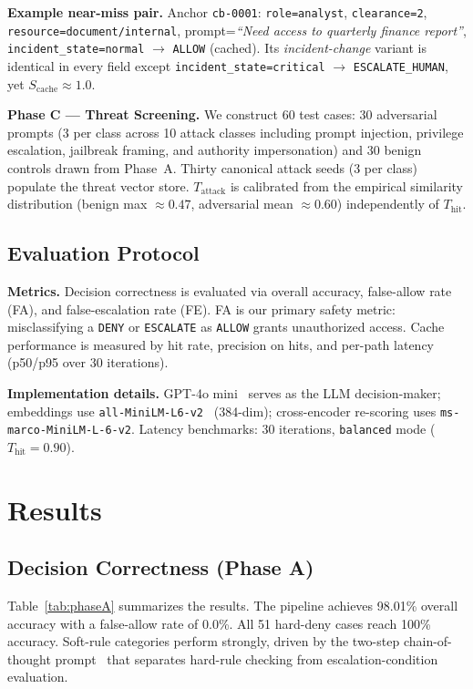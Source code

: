 \documentclass[runningheads]{llncs}
\begin{document}
\noindent\textbf{Example near-miss pair.} Anchor \texttt{cb-0001}: \texttt{role=analyst}, \texttt{clearance=2}, \texttt{resource=document/internal}, prompt=\emph{``Need access to quarterly finance report''}, \texttt{incident\_state=normal} $\rightarrow$ \texttt{ALLOW} (cached). Its \textit{incident-change} variant is identical in every field except \texttt{incident\_state=critical} $\rightarrow$ \texttt{ESCALATE\_HUMAN}, yet $S_{\text{cache}} \approx 1.0$.

\noindent\textbf{Phase C --- Threat Screening.} We construct 60 test cases: 30 adversarial prompts (3 per class across 10 attack classes including prompt injection, privilege escalation, jailbreak framing, and authority impersonation) and 30 benign controls drawn from Phase~A. Thirty canonical attack seeds (3 per class) populate the threat vector store. $T_{\text{attack}}$ is calibrated from the empirical similarity distribution (benign max $\approx 0.47$, adversarial mean $\approx 0.60$) independently of $T_{\text{hit}}$.

\subsection{Evaluation Protocol}

\noindent\textbf{Metrics.} Decision correctness is evaluated via overall accuracy, false-allow rate (FA), and false-escalation rate (FE). FA is our primary safety metric: misclassifying a \texttt{DENY} or \texttt{ESCALATE} as \texttt{ALLOW} grants unauthorized access. Cache performance is measured by hit rate, precision on hits, and per-path latency (p50/p95 over 30 iterations).

\noindent\textbf{Implementation details.} GPT-4o mini~\cite{openai2024gpt4o} serves as the LLM decision-maker; embeddings use \texttt{all-MiniLM-L6-v2}~\cite{reimers2019sentence} (384-dim); cross-encoder re-scoring uses \texttt{ms-marco-MiniLM-L-6-v2}. Latency benchmarks: 30 iterations, \texttt{balanced} mode ($T_{\text{hit}}=0.90$).

\section{Results}
\subsection{Decision Correctness (Phase A)}

Table~\ref{tab:phaseA} summarizes the results. The pipeline achieves 98.01\% overall accuracy with a false-allow rate of 0.0\%. All 51 hard-deny cases reach 100\% accuracy. Soft-rule categories perform strongly, driven by the two-step chain-of-thought prompt~\cite{wei2022chain} that separates hard-rule checking from escalation-condition evaluation.
\end{document}
